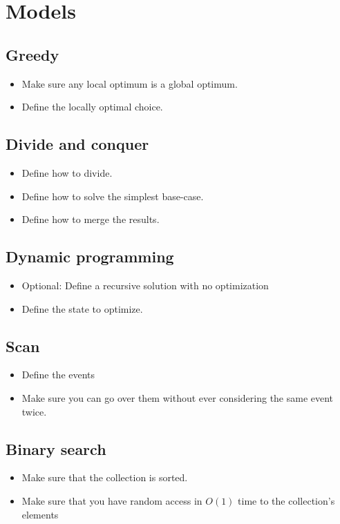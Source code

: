\documentclass[guide.tex]{subfiles}
\begin{document}
\section{Models}
\subsection{Greedy}

\begin{itemize}
  \item Make sure any local optimum is a global optimum.
  \item Define the locally optimal choice.
\end{itemize}

\subsection{Divide and conquer}
\begin{itemize}
  \item Define how to divide.
  \item Define how to solve the simplest base-case.
  \item Define how to merge the results.
\end{itemize}

\subsection{Dynamic programming}
\begin{itemize}
  \item Optional: Define a recursive solution with no optimization
  \item Define the state to optimize.
\end{itemize}

\subsection{Scan}
\begin{itemize}
  \item Define the events
	\item Make sure you can go over them without ever considering the same event twice.
\end{itemize}

\subsection{Binary search}
\begin{itemize}
  \item Make sure that the collection is sorted.
  \item Make sure that you have random access in $O(1)$ time to the collection's elements
\end{itemize}
\end{document}
